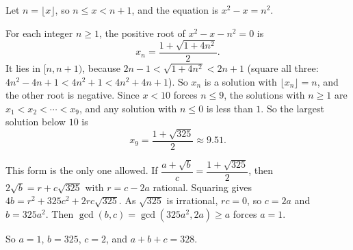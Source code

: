 Let $n=\lfloor x\rfloor$, so $n\le x<n+1$, and the equation is $x^2-x=n^2$.

For each integer $n\ge1$, the positive root of $x^2-x-n^2=0$ is
\[x_n=\dfrac{1+\sqrt{1+4n^2}}{2}.\]
It lies in $[n,n+1)$, because $2n-1<\sqrt{1+4n^2}<2n+1$ (square all three: $4n^2-4n+1<4n^2+1<4n^2+4n+1$). So $x_n$ is a solution with $\lfloor x_n\rfloor=n$, and the other root is negative. Since $x<10$ forces $n\le9$, the solutions with $n\ge1$ are $x_1<x_2<\cdots<x_9$, and any solution with $n\le0$ is less than $1$. So the largest solution below $10$ is
\[x_9=\dfrac{1+\sqrt{325}}{2}\approx9.51.\]

This form is the only one allowed. If $\dfrac{a+\sqrt b}{c}=\dfrac{1+\sqrt{325}}2$, then $2\sqrt b=r+c\sqrt{325}$ with $r=c-2a$ rational. Squaring gives $4b=r^2+325c^2+2rc\sqrt{325}$. As $\sqrt{325}$ is irrational, $rc=0$, so $c=2a$ and $b=325a^2$. Then $\gcd(b,c)=\gcd\left(325a^2,2a\right)\ge a$ forces $a=1$.

So $a=1$, $b=325$, $c=2$, and $a+b+c=\boxed{328}$.
